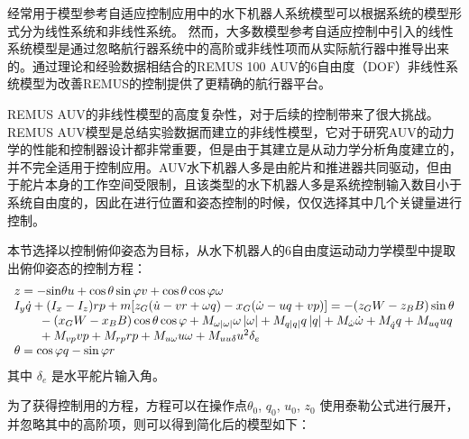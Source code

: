 经常用于模型参考自适应控制应用中的水下机器人系统模型可以根据系统的模型形式分为线性系统和非线性系统。 然而，大多数模型参考自适应控制中引入的线性系统模型是通过忽略航行器系统中的高阶或非线性项而从实际航行器中推导出来的。通过理论和经验数据相结合的REMUS 100 AUV的6自由度（DOF）非线性系统模型为改善REMUS的控制提供了更精确的航行器平台。

REMUS AUV的非线性模型的高度复杂性，对于后续的控制带来了很大挑战。 REMUS AUV模型是总结实验数据而建立的非线性模型，它对于研究AUV的动力学的性能和控制器设计都非常重要，但是由于其建立是从动力学分析角度建立的，并不完全适用于控制应用。AUV水下机器人多是由舵片和推进器共同驱动，但由于舵片本身的工作空间受限制，且该类型的水下机器人多是系统控制输入数目小于系统自由度的，因此在进行位置和姿态控制的时候，仅仅选择其中几个关键量进行控制。

本节选择以控制俯仰姿态为目标，从水下机器人的6自由度运动动力学模型中提取出俯仰姿态的控制方程：
\begin{equation}
\label{depth_equ}
\begin{array}{l}
 z =  - {\rm{sin}}\theta u + \cos \theta \sin \varphi v + \cos \theta \cos \varphi \omega  \\
 {I_y}\dot q + ({I_x} - {I_z})rp + m[{z_G}(\dot u - vr + \omega q) - {x_G}(\dot \omega  - uq + vp)] =  - ({z_G}W - {z_B}B)\sin \theta  \\
 \begin{array}{*{20}{c}}
   {} & {}  \\
\end{array} - ({x_G}W - {x_B}B)\cos \theta \cos \varphi  + {M_{\omega \left| \omega  \right|}}\omega \left| \omega  \right| + {M_{q\left| q \right|}}q\left| q \right| + {M_{\dot \omega }}\dot \omega  + M_{\dot q}^{}q + {M_{uq}}uq \\
 \begin{array}{*{20}{c}}
   {} & {}  \\
\end{array} + {M_{vp}}vp + {M_{rp}}rp + {M_{u\omega }}u\omega  + {M_{uu\delta }}{u^2}{\delta _e} \\
 \theta  = \cos \varphi q - \sin \varphi r \\
 \end{array}
\end{equation}
其中 $\delta_e$ 是水平舵片输入角。

为了获得控制用的方程，方程可以在操作点$\theta_0$, $q_0$, $u_0$, $z_0$ 使用泰勒公式进行展开，并忽略其中的高阶项，则可以得到简化后的模型如下：


